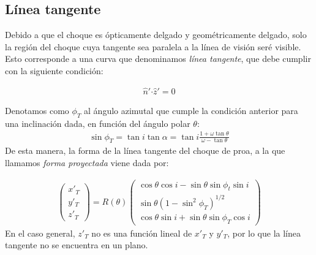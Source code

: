 \subsection{Línea tangente}
\label{sec:tangent-line}
Debido a que el choque es ópticamente delgado y geométricamente
delgado, solo la región del choque cuya tangente sea paralela a la
línea de visión seré visible. Esto corresponde a una curva que
denominamos \textit{línea tangente}, que debe cumplir con la siguiente
condición:

\begin{align}
  \hat{n}'\boldsymbol{\cdot} \hat{z}' = 0
\end{align}

Denotamos como $\phi_T$ al ángulo azimutal que cumple la condición anterior
para una inclinación dada, en función del ángulo polar $\theta$:
\begin{align}
  \sin\phi_T = \tan i\tan\alpha = \tan i\frac{1+\omega\tan\theta}{\omega-\tan\theta}
  \label{eq:phi-tan}
\end{align}
De esta manera, la forma de la línea tangente del choque de proa, a la que llamamos
\textit{forma proyectada} viene dada por:

\begin{align}
  \left(
  \begin{array}{c}
    x'_T \\
    y'_T \\
    z'_T
  \end{array}
  \right) =
  R(\theta)\left(
  \begin{array}{c}
    \cos\theta\cos i - \sin\theta\sin\phi_t\sin i \\
    \sin\theta\left(1-\sin^2\phi_T\right)^{1/2} \\
    \cos\theta\sin i + \sin\theta\sin\phi_T\cos i
  \end{array}
  \right) \label{eq:proj-shape}
\end{align}
En el caso general, $z'_T$ no es una función lineal de $x'_T$ y $y'_T$, por lo que
la línea tangente no se encuentra en un plano.

